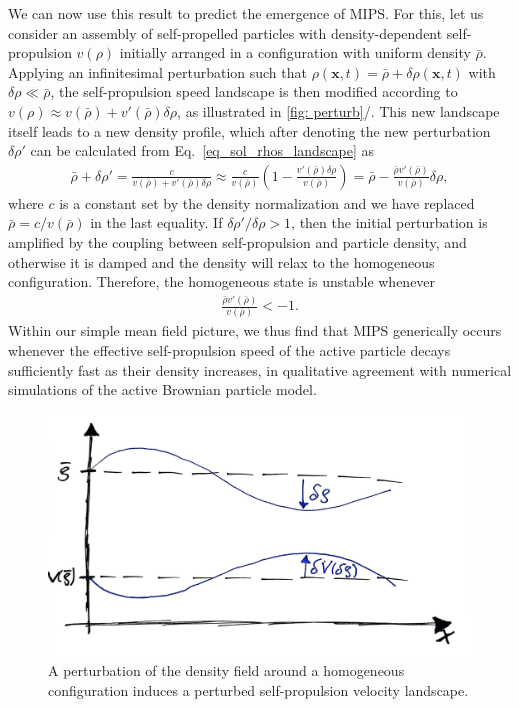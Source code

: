 We can now use this result to predict the emergence of MIPS. 
For this, let us consider an assembly of self-propelled particles with density-dependent self-propulsion $v(\rho)$ initially arranged in a configuration with uniform density $\bar\rho$.
Applying an infinitesimal perturbation such that $\rho(\bm x,t) = \bar \rho + \delta \rho(\bm x,t)$ with $\delta \rho \ll \bar\rho$,
the self-propulsion speed landscape is then modified according to $v(\rho) \approx v(\bar \rho) + v'(\bar \rho)\delta\rho$, as illustrated in \autoref{fig: perturb}/.
This new landscape itself leads to a new density profile, which after denoting the new perturbation $\delta\rho'$ can be calculated from Eq.~\eqref{eq_sol_rhos_landscape} as 
%
\begin{align*}
    \bar \rho + \delta \rho'
    = 
    \frac{c}{v(\bar \rho) + v'(\bar \rho)\delta \rho}
    \approx \frac{c}{v(\bar \rho)} \left( 1 - \frac{v'(\bar \rho) \delta \rho}{v(\bar \rho)} \right)
    =
    \bar\rho - \frac{\bar\rho v'(\bar \rho)}{v(\bar \rho)} \delta \rho 
    ,
\end{align*}
%
where $c$ is a constant set by the density normalization and we have replaced $\bar\rho = c/v(\bar\rho)$ in the last equality. 
If $\delta\rho'/\delta\rho > 1$, then the initial perturbation is amplified by the coupling between self-propulsion and particle density, and otherwise it is damped and the density will relax to the homogeneous configuration.
Therefore, the homogeneous state is unstable whenever
\begin{align*}
    \frac{\bar \rho v'(\bar \rho)}{v(\bar\rho)} < -1.
\end{align*}
Within our simple mean field picture, we thus find that MIPS generically occurs whenever the effective self-propulsion speed of the active particle decays sufficiently fast as their density increases,
in qualitative agreement with numerical simulations of the active Brownian particle model.

\begin{figure}[!t]
    \centering
    \includegraphics[width=.35\textwidth]{chapters/Figures/scalar/perturb.pdf}
    \caption{A perturbation of the density field around a homogeneous configuration induces a perturbed self-propulsion velocity landscape.}
    \label{fig: perturb}
\end{figure}


